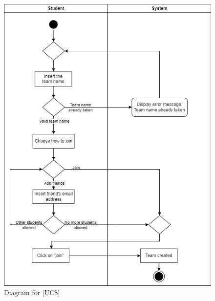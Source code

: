 \documentclass[12pt,oneside,a4paper]{article}
\begin{document}
\begin{figure}
    \centering
    \includegraphics[width=1\linewidth]{Images//Diagrams/StudentEnrollsBattle.png}
    \caption{Diagram for [UC8]}
    \label{fig:enter-label}
\end{figure}

\clearpage
\end{document}
